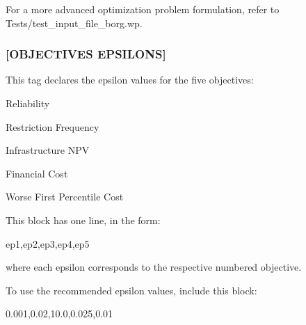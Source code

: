 For a more advanced optimization problem formulation, refer to {\ttfamily Tests/test\+\_\+input\+\_\+file\+\_\+borg.\+wp}.

\subsubsection*{\mbox{[}O\+B\+J\+E\+C\+T\+I\+V\+ES E\+P\+S\+I\+L\+O\+NS\mbox{]}}

This tag declares the epsilon values for the five objectives\+:
\begin{DoxyEnumerate}
\item Reliability
\item Restriction Frequency
\item Infrastructure N\+PV
\item Financial Cost
\item Worse First Percentile Cost
\end{DoxyEnumerate}

This block has one line, in the form\+: 
\begin{DoxyCode}
ep1,ep2,ep3,ep4,ep5
\end{DoxyCode}
 where each epsilon corresponds to the respective numbered objective.~\newline


To use the recommended epsilon values, include this block\+: 
\begin{DoxyCode}
0.001,0.02,10.0,0.025,0.01
\end{DoxyCode}
 